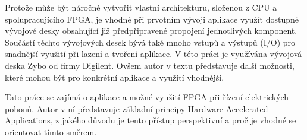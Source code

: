 \documentclass[a4paper, twoside, 11pt]{article}
\begin{document}
Protože může být náročné vytvořit vlastní architekturu, složenou z CPU a spolupracujícího FPGA, je vhodné při prvotním vývoji aplikace využít dostupné vývojové desky obsahující již předpřipravené propojení jednotlivých komponent. Součástí těchto vývojových desek bývá také mnoho vstupů a výstupů (I/O) pro snadnější využití při lazení a tvoření aplikace. V této práci je využívána vývojová deska Zybo od firmy Digilent. Ovšem autor v textu představuje další možnosti, které mohou být pro konkrétní aplikace a využití vhodnější.\par
Tato práce se zajímá o aplikace a možné využití FPGA při řízení elektrických pohonů. Autor v ní představuje základní principy Hardware Accelerated Applications, z jakého důvodu je tento přístup perspektivní a proč je vhodné se orientovat tímto směrem.\par
\flushbottom %
\newpage
\end{document}
